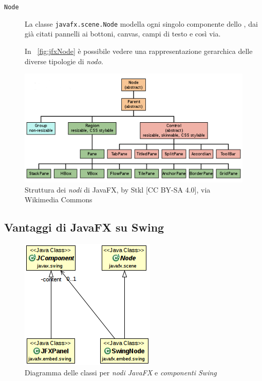 \begin{description}
                \item[\texttt{Node}]\label{itm:nod} La classe \texttt{javafx\dothyp scene\dothyp Node} modella ogni singolo componente dello , dai già citati pannelli ai bottoni, canvas, campi di testo e così via.

                In \figurename~\vref{fig:jfxNode} è possibile vedere una rappresentazione gerarchica delle diverse tipologie di \emph{nodo}.
            \end{description}

            \begin{figure}[htbp]
                \centering
                \includegraphics[scale=0.8]{img/Javafx-layout-classes}
                \caption{Struttura dei \emph{nodi} di JavaFX, by Stkl [CC BY-SA 4.0], via Wikimedia Commons}
                \label{fig:jfxNode}
            \end{figure}

        \subsection{Vantaggi di JavaFX su Swing}\label{sub:jfxVantaggi}

            \begin{figure}[hbpt]
                \centering
                \includegraphics[scale=0.8]{img/jfxSwingAdapt}
                \caption{Diagramma delle classi  per \emph{nodi JavaFX} e \emph{componenti Swing}}
                \label{fig:jfxSwingAdapt}
            \end{figure}

